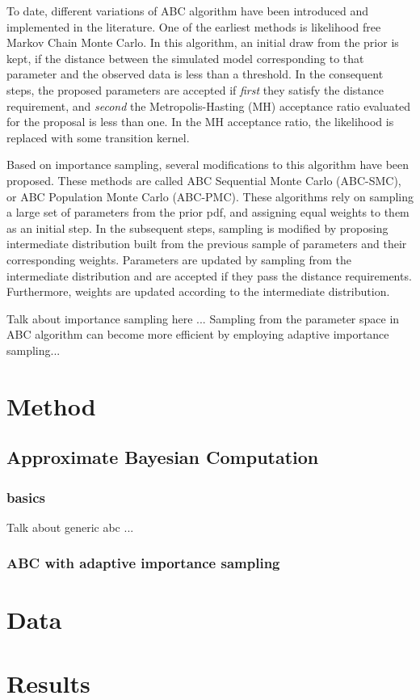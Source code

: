 \documentclass[12pt, preprint]{aastex}
\begin{document}
To date, different variations of ABC algorithm have been introduced  and implemented 
in the literature. One of the earliest methods is likelihood free Markov Chain Monte 
Carlo. In this algorithm, an initial draw from the prior is kept, if the distance between 
the simulated model corresponding to that parameter and the observed data is less than a threshold. 
In the consequent steps, the proposed parameters are accepted if \emph{first} they satisfy the 
distance requirement, and \emph{second} the Metropolis-Hasting (MH) acceptance ratio evaluated for the 
proposal is less than one. In the MH acceptance ratio, the likelihood is replaced with some transition 
kernel. 

Based on importance sampling, several modifications to this algorithm have been proposed. 
These methods are called ABC Sequential Monte Carlo (ABC-SMC), or ABC Population Monte Carlo 
(ABC-PMC). These algorithms rely on sampling a large set of parameters from the prior pdf, and assigning 
equal weights to them as an initial step. In the subsequent steps, sampling is modified by 
proposing intermediate distribution built from the previous sample of parameters and their 
corresponding weights. Parameters are updated by sampling from the intermediate distribution 
and are accepted if they pass the distance requirements. Furthermore, weights are updated according 
to the intermediate distribution. 

Talk about importance sampling here ...
Sampling from the parameter space in ABC algorithm can become more efficient by 
employing adaptive importance sampling... 

\section{Method}

\subsection{Approximate Bayesian Computation}

\subsubsection{basics}

Talk about generic abc ...

\subsubsection{ABC with adaptive importance sampling}






\section{Data}




\section{Results}


\begin{thebibliography}{70}


\end{thebibliography}
\end{document}
